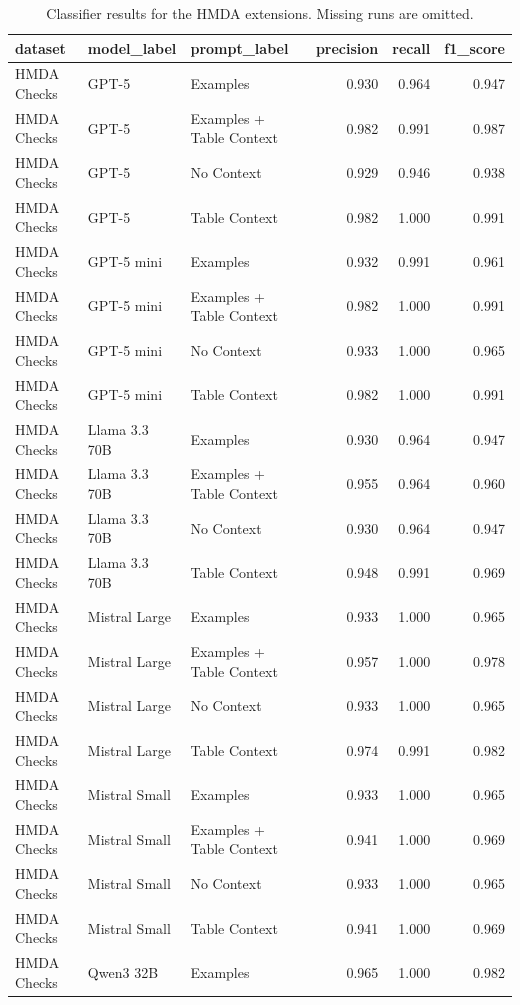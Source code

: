 \begin{table}
\caption{Classifier results for the HMDA extensions. Missing runs are omitted.}
\label{tab:classifier-hmda-results}
\begin{tabular}{lllrrr}
\toprule
dataset & model_label & prompt_label & precision & recall & f1_score \\
\midrule
HMDA Checks & GPT-5 & Examples & 0.930 & 0.964 & 0.947 \\
HMDA Checks & GPT-5 & Examples + Table Context & 0.982 & 0.991 & 0.987 \\
HMDA Checks & GPT-5 & No Context & 0.929 & 0.946 & 0.938 \\
HMDA Checks & GPT-5 & Table Context & 0.982 & 1.000 & 0.991 \\
HMDA Checks & GPT-5 mini & Examples & 0.932 & 0.991 & 0.961 \\
HMDA Checks & GPT-5 mini & Examples + Table Context & 0.982 & 1.000 & 0.991 \\
HMDA Checks & GPT-5 mini & No Context & 0.933 & 1.000 & 0.965 \\
HMDA Checks & GPT-5 mini & Table Context & 0.982 & 1.000 & 0.991 \\
HMDA Checks & Llama 3.3 70B & Examples & 0.930 & 0.964 & 0.947 \\
HMDA Checks & Llama 3.3 70B & Examples + Table Context & 0.955 & 0.964 & 0.960 \\
HMDA Checks & Llama 3.3 70B & No Context & 0.930 & 0.964 & 0.947 \\
HMDA Checks & Llama 3.3 70B & Table Context & 0.948 & 0.991 & 0.969 \\
HMDA Checks & Mistral Large & Examples & 0.933 & 1.000 & 0.965 \\
HMDA Checks & Mistral Large & Examples + Table Context & 0.957 & 1.000 & 0.978 \\
HMDA Checks & Mistral Large & No Context & 0.933 & 1.000 & 0.965 \\
HMDA Checks & Mistral Large & Table Context & 0.974 & 0.991 & 0.982 \\
HMDA Checks & Mistral Small & Examples & 0.933 & 1.000 & 0.965 \\
HMDA Checks & Mistral Small & Examples + Table Context & 0.941 & 1.000 & 0.969 \\
HMDA Checks & Mistral Small & No Context & 0.933 & 1.000 & 0.965 \\
HMDA Checks & Mistral Small & Table Context & 0.941 & 1.000 & 0.969 \\
HMDA Checks & Qwen3 32B & Examples & 0.965 & 1.000 & 0.982 \\

\end{tabular}
\end{table}

